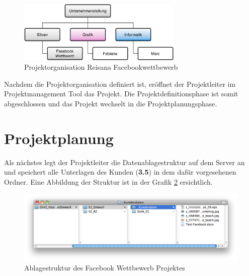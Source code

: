 \clearpage

\begin{figure}[htbp]
\begin{center}
\includegraphics[width=0.7\textwidth,angle=0]{./bilder/proof_of_concept/projektorganisation_poc.pdf}
\caption[Projektorganisation Reisana Facebookwettbewerb]{Projektorganisation 
    Reisana Facebookwettbewerb\footnotemark}
\label{pic:projektorganisation_poc}
\end{center}
\end{figure}

Nachdem die Projektorganisation definiert ist, eröffnet der Projektleiter
im Projektmanagement Tool das Projekt. Die Projektdefinitionsphase ist somit 
abgeschlossen und das Projekt wechselt in die Projektplanungsphase.

\section{Projektplanung}
Als nächstes legt der Projektleiter die Datenablagestruktur auf dem Server an
und speichert alle Unterlagen des Kunden (\textbf{3.5}) in dem dafür vorgesehenen Ordner.
Eine Abbildung der Struktur ist in der Grafik \ref{pic:ablagestruktur_poc} ersichtlich.

\begin{figure}[htbp]
\begin{center}
\includegraphics[width=1.0\textwidth,angle=0]{./bilder/proof_of_concept/ablagestruktur_poc.png}
\caption[Ablagestruktur des Facebook Wettbewerb Projektes]{Ablagestruktur des 
    Facebook Wettbewerb Projektes\footnotemark}
\label{pic:ablagestruktur_poc}
\end{center}
\end{figure}

